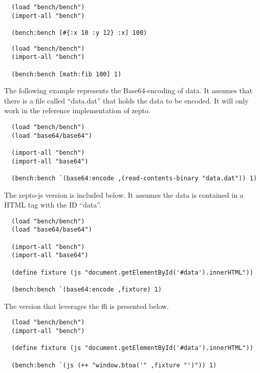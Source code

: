 \documentclass[oneside,11pt,xetex]{scrbook}
\begin{document}
\begin{listing}[H]
\caption{Hashmap Access}
\begin{verbatim}
  (load "bench/bench")
  (import-all "bench")

  (bench:bench [#{:x 10 :y 12} :x] 100)
\end{verbatim}
\end{listing}

\begin{listing}[H]
\caption{Calculation of Fibonacci(100)}
\begin{verbatim}
  (load "bench/bench")
  (import-all "bench")

  (bench:bench [math:fib 100] 1)
\end{verbatim}
\end{listing}

The following example represents the Base64-encoding of data.
It assumes that there is a file called ``data.dat'' that holds
the data to be encoded. It will only work in the reference
implementation of zepto.

\begin{listing}[H]
\caption{Base64 for zepto}
\begin{verbatim}
  (load "bench/bench")
  (load "base64/base64")

  (import-all "bench")
  (import-all "base64")

  (bench:bench `(base64:encode ,(read-contents-binary "data.dat")) 1)
\end{verbatim}
\end{listing}

The zepto-js version is included below. It assumes the data
is contained in a HTML tag with the ID ``data''.

\begin{listing}[H]
\caption{Base64 for zepto-js}
\begin{verbatim}
  (load "bench/bench")
  (load "base64/base64")

  (import-all "bench")
  (import-all "base64")

  (define fixture (js "document.getElementById('#data').innerHTML"))

  (bench:bench `(base64:encode ,fixture) 1)
\end{verbatim}
\end{listing}

The version that leverages the \gls{ffi} is presented below.

\begin{listing}[H]
\caption{Base64 for zepto-js, using the \gls{ffi}}
\begin{verbatim}
  (load "bench/bench")
  (import-all "bench")

  (define fixture (js "document.getElementById('#data').innerHTML"))

  (bench:bench `(js (++ "window.btoa('" ,fixture "')")) 1)
\end{verbatim}
\end{listing}
\end{document}

